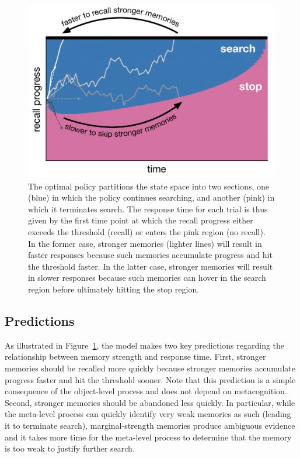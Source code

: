 \begin{figure}
  \centering
  \includegraphics[scale=0.45]{figs/memory/exp1_predictions.pdf}
  \caption{
    The optimal policy partitions the state space into two sections, one (blue) in which the policy continues searching, and another (pink) in which it terminates search. The response time for each trial is thus given by the first time point at which the recall progress either exceeds the threshold (recall) or enters the pink region (no recall). In the former case, stronger memories (lighter lines) will result in faster responses because such memories accumulate progress and hit the threshold faster. In the latter case, stronger memories will result in slower responses because such memories can hover in the search region before ultimately hitting the stop region.
  }
  \label{fig:exp1_predictions}
\end{figure}

\subsection{Predictions}

As illustrated in Figure~\ref{fig:exp1_predictions}, the model makes two key predictions regarding the relationship between memory strength and response time. First, stronger memories should be recalled more quickly because stronger memories accumulate progress faster and hit the threshold sooner. Note that this prediction is a simple consequence of the object-level process and does not depend on metacognition. Second, stronger memories should be abandoned less quickly. In particular, while the meta-level process can quickly identify very weak memories as such (leading it to terminate search), marginal-strength memories produce ambiguous evidence and it takes more time for the meta-level process to determine that the memory is too weak to justify further search.

